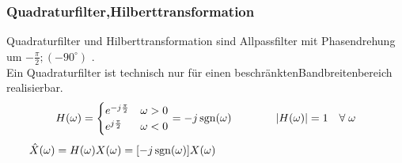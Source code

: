 	\subsubsection{Quadraturfilter,Hilberttransformation}
		\label{lti_quadratur}\label{lti_hilbert}
		Quadraturfilter und Hilberttransformation sind Allpassfilter mit
		Phasendrehung um $-\frac{\pi}{2};(-90^\circ)$ %
		.\\
		Ein Quadraturfilter ist technisch nur für einen beschränktenBandbreitenbereich realisierbar.
		\[
			H(\omega) = \begin{cases}
             	e^{-j \frac{\pi}{2}} & \omega > 0 \\
             	e^{j \frac{\pi}{2}} & \omega < 0
             \end{cases} =
				-j \operatorname{sgn}(\omega)
				\qquad \qquad
				|H(\omega)| = 1 \quad \forall \; \omega 
		\]
		$\qquad \hat{X}(\omega) = H(\omega)X(\omega) = [-j \operatorname{sgn}(\omega)] X(\omega)$